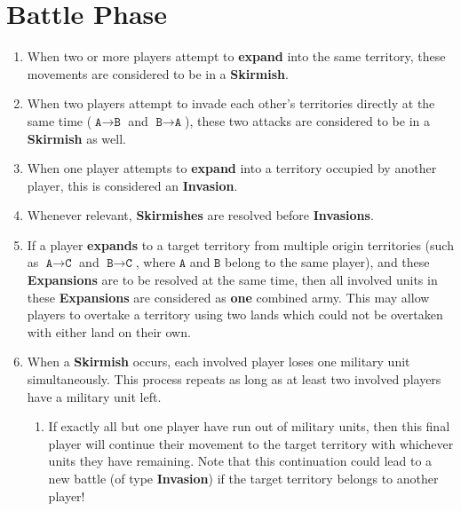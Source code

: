 \documentclass[10pt,openright,a4paper,openany]{article}
\newcommand{\term}[1]{\textbf{\color{purple} #1}}
\begin{document}
\section{Battle Phase}\label{sec:battle}
\begin{enumerate}
	\item When two or more players attempt to \term{expand} into the same territory, these movements are considered to be in a \term{Skirmish}.
	\item When two players attempt to invade each other's territories directly at the same time ($\texttt{A} \to \texttt{B}$ and $\texttt{B} \to \texttt{A}$), these two attacks are considered to be in a \term{Skirmish} as well.
	\item When one player attempts to \term{expand} into a territory occupied by another player, this is considered an \term{Invasion}.
	\item Whenever relevant, \term{Skirmishes} are resolved before \term{Invasions}.
	\item If a player \term{expands} to a target territory from multiple origin territories (such as $\texttt{A} \to \texttt{C}$ and $\texttt{B} \to \texttt{C}$, where $\texttt{A}$ and $\texttt{B}$ belong to the same player), and these \term{Expansions} are to be resolved at the same time, then all involved units in these \term{Expansions} are considered as \textbf{one} combined army. This may allow players to overtake a territory using two lands which could not be overtaken with either land on their own.
	\item \label{rule:skirmish}When a \term{Skirmish} occurs, each involved player loses one military unit simultaneously. This process repeats as long as at least two involved players have a military unit left.
	\begin{enumerate}
		\item If exactly all but one player have run out of military units, then this final player will continue their movement to the target territory with whichever units they have remaining. Note that this continuation could lead to a new battle (of type \term{Invasion}) if the target territory belongs to another player!
	\end{enumerate}

\end{enumerate}
\end{document}
